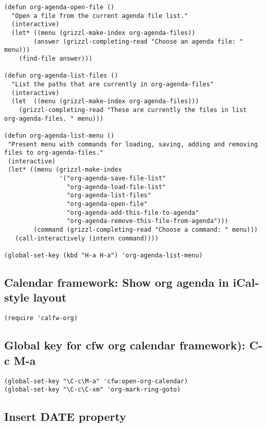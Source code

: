 \documentclass[10pt]{article}
\begin{document}
\begin{verbatim}
(defun org-agenda-open-file ()
  "Open a file from the current agenda file list."
  (interactive)
  (let* ((menu (grizzl-make-index org-agenda-files))
        (answer (grizzl-completing-read "Choose an agenda file: " menu)))
    (find-file answer)))

(defun org-agenda-list-files ()
  "List the paths that are currently in org-agenda-files"
  (interactive)
  (let  ((menu (grizzl-make-index org-agenda-files)))
    (grizzl-completing-read "These are currently the files in list org-agenda-files. " menu)))

(defun org-agenda-list-menu ()
 "Present menu with commands for loading, saving, adding and removing
files to org-agenda-files."
 (interactive)
 (let* ((menu (grizzl-make-index
               '("org-agenda-save-file-list"
                 "org-agenda-load-file-list"
                 "org-agenda-list-files"
                 "org-agenda-open-file"
                 "org-agenda-add-this-file-to-agenda"
                 "org-agenda-remove-this-file-from-agenda")))
        (command (grizzl-completing-read "Choose a command: " menu)))
   (call-interactively (intern command))))

(global-set-key (kbd "H-a H-a") 'org-agenda-list-menu)
\end{verbatim}


\subsection{Calendar framework: Show org agenda in iCal-style layout}
\label{sec-8-3}

\begin{verbatim}
(require 'calfw-org)
\end{verbatim}

\subsection{Global key for cfw org calendar framework): C-c M-a}
\label{sec-8-4}

\begin{verbatim}
(global-set-key "\C-c\M-a" 'cfw:open-org-calendar)
(global-set-key "\C-c\C-xm" 'org-mark-ring-goto)
\end{verbatim}

\subsection{Insert DATE property}
\label{sec-8-5}
\end{document}
